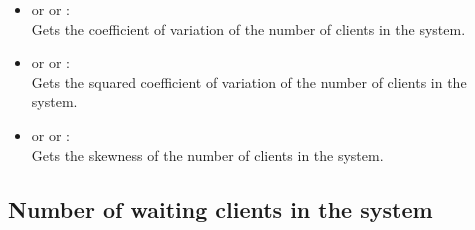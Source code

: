 \begin{itemize}
\item
{} or  or :\\
Gets the coefficient of variation of the number of clients in the system.

\item
{} or  or :\\
Gets the squared coefficient of variation of the number of clients in the system.

\item
{} or  or :\\
Gets the skewness of the number of clients in the system.

\end{itemize}



\subsection{Number of waiting clients in the system}

